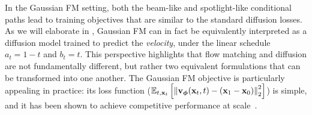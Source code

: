 \begin{table}[th]
\caption{Summary of different interpolants written as 
  $\rvx_t = a_t \rvx_0 + b_t \rvx_1$, where 
  $\rvx_0 \sim p_{\mathrm{src}}=p_{\mathrm{prior}}$ and 
  $\rvx_1 \sim p_{\mathrm{tgt}}=p_{\mathrm{data}}$. 
  The FM/RF and trigonometric columns use the FM convention ($t=0$ source, $t=1$ target). 
  For comparison, the VE/VP columns retain their usual diffusion-time indexing ($t=0$ data, $t=1$ prior/noise), with coefficient names relabeled as $a_t:=\sigma_t$ and $b_t:=\alpha_t$.}
  \small
  \centering
  \label{tb:interpolant_instances}
\end{table}



In the Gaussian FM setting, both the beam-like and spotlight-like conditional paths lead to training objectives that are  similar to the standard diffusion losses. As we will elaborate in , Gaussian FM can in fact be equivalently interpreted as a diffusion model trained to predict the \emph{velocity}, under the linear schedule $a_t = 1-t$ and $b_t = t$. This perspective highlights that flow matching and diffusion are not fundamentally different, but rather two equivalent formulations that can be transformed into one another. The Gaussian FM objective is particularly appealing in practice: its loss function ($\mathbb{E}_{t,{\mathbf{x}}_t} \left[\left\lVert{\mathbf{v}}_{\bm{\phi}}({\mathbf{x}}_t, t) - ({\mathbf{x}}_1 - {\mathbf{x}}_0)\right\rVert_2^2\right]$) is simple, and it has been shown to achieve competitive performance at scale~\citep{esser2024scaling}. 




